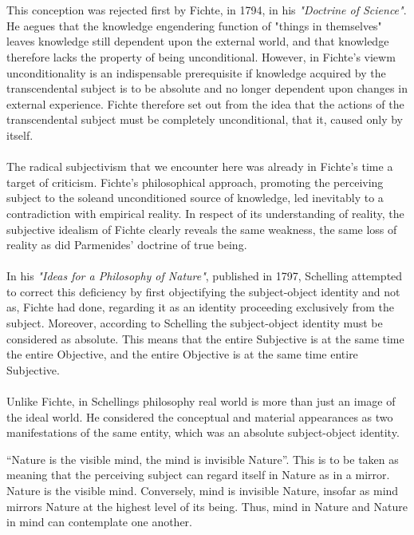 \documentclass[9pt,a4paper,twocolumn]{article}
\newcounter{def}
\begin{document}
                \\
                \\
                This conception was rejected first by Fichte, in 1794, in his \textit{"Doctrine of Science"}. He aegues that the knowledge engendering function of "things in themselves" leaves knowledge still dependent upon the external world, and that knowledge therefore lacks the property of being unconditional. However, in Fichte's viewm unconditionality is an indispensable prerequisite if knowledge acquired by the transcendental subject is to be absolute and no longer dependent upon changes in external experience. Fichte therefore set out from the idea that the actions of the transcendental subject must be completely unconditional, that it, caused only by itself.
                \\
                \\
                The radical subjectivism that we encounter here was already in Fichte's time a target of criticism. Fichte's philosophical approach, promoting the perceiving subject to the soleand unconditioned source of knowledge, led inevitably to a contradiction with empirical reality. In respect of its understanding of reality, the subjective idealism of Fichte clearly reveals the same weakness, the same loss of reality as did Parmenides' doctrine of true being.
                \\
                \\
                In his \textit{"Ideas for a Philosophy of Nature"}, published in 1797, Schelling attempted to correct this deficiency by first objectifying the subject-object identity and not as, Fichte had done, regarding it as an identity proceeding exclusively from the subject. Moreover, according to Schelling the subject-object identity must be considered as absolute. This means that the entire Subjective is at the same time the entire Objective, and the entire Objective is at the same time entire Subjective.
                \\
                \\
                Unlike Fichte, in Schellings philosophy real world is more than just an image of the ideal world. He considered the conceptual and material appearances as two manifestations of the same entity, which was an absolute subject-object identity.
            \begin{qt}
                “Nature is the visible mind, the mind is invisible Nature”. This is to be taken as meaning that the perceiving subject can regard itself in Nature as in a mirror. Nature is the visible mind. Conversely, mind is invisible Nature, insofar as mind mirrors Nature at the highest level of its being. Thus, mind in Nature and Nature in mind can contemplate one another.
            \end{qt}
\end{document}
